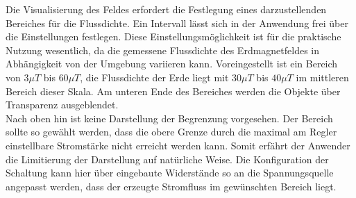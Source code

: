 Die Visualisierung des Feldes erfordert die Festlegung eines darzustellenden Bereiches für die Flussdichte. Ein Intervall lässt sich in der Anwendung frei über die Einstellungen festlegen. Diese Einstellungsmöglichkeit ist für die praktische Nutzung wesentlich, da die gemessene Flussdichte des Erdmagnetfeldes in Abhängigkeit von der Umgebung variieren kann. Voreingestellt ist ein Bereich von $3\mu T$ bis $60\mu T$, die Flussdichte der Erde liegt mit $30 \mu T$ bis $40 \mu T$ im mittleren Bereich dieser Skala. Am unteren Ende des Bereiches werden die Objekte über Transparenz ausgeblendet.\\

Nach oben hin ist keine Darstellung der Begrenzung vorgesehen. Der Bereich sollte so gewählt werden, dass die obere Grenze durch die maximal am Regler einstellbare Stromstärke nicht erreicht werden kann. Somit erfährt der Anwender die Limitierung der Darstellung auf natürliche Weise. Die Konfiguration der Schaltung kann hier über eingebaute Widerstände so an die Spannungsquelle angepasst werden, dass der erzeugte Stromfluss im gewünschten Bereich liegt.\\

